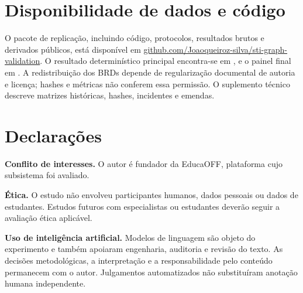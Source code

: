 \documentclass[11pt,a4paper]{article}
\begin{document}
\section*{Disponibilidade de dados e código}

O pacote de replicação, incluindo código, protocolos, resultados brutos e derivados públicos, está disponível em \href{https://github.com/Joaoqueiroz-silva/sti-graph-validation}{github.com/Joaoqueiroz-silva/sti-graph-validation}. O resultado determinístico principal encontra-se em , e o painel final em . A redistribuição dos BRDs depende de regularização documental de autoria e licença; hashes e métricas não conferem essa permissão. O suplemento técnico descreve matrizes históricas, hashes, incidentes e emendas.

\section*{Declarações}

\textbf{Conflito de interesses.} O autor é fundador da EducaOFF, plataforma cujo subsistema foi avaliado.

\textbf{Ética.} O estudo não envolveu participantes humanos, dados pessoais ou dados de estudantes. Estudos futuros com especialistas ou estudantes deverão seguir a avaliação ética aplicável.

\textbf{Uso de inteligência artificial.} Modelos de linguagem são objeto do experimento e também apoiaram engenharia, auditoria e revisão do texto. As decisões metodológicas, a interpretação e a responsabilidade pelo conteúdo permanecem com o autor. Julgamentos automatizados não substituíram anotação humana independente.


\end{document}
